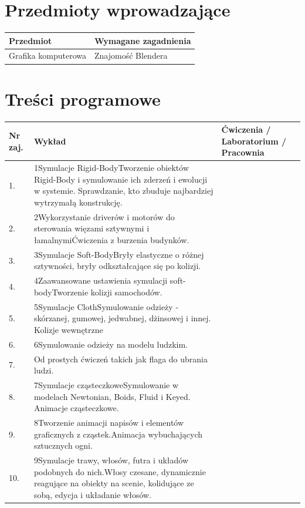 \documentclass[12pt, a4paper]{article}
\begin{document}
\section{Przedmioty wprowadzające}

\begin{tabularx}{\textwidth}{lX}
  \hline
  \textbf{Przedmiot} & \textbf{Wymagane zagadnienia} \\
  \hline
  Grafika komputerowa & Znajomość Blendera \\
  \hline
\end{tabularx}

\section{Treści programowe}

\begin{longtable}{|p{1.5cm}|p{6.5cm}|p{6.5cm}|}
\hline
\textbf{Nr zaj.} & \textbf{Wykład} & \textbf{Ćwiczenia / Laboratorium / Pracownia} \\\hline
\endhead
  \hline
  1. & 1Symulacje Rigid-BodyTworzenie obiektów Rigid-Body i symulowanie ich zderzeń i ewolucji w systemie. Sprawdzanie, kto zbuduje najbardziej wytrzymałą konstrukcję. &  \\
  \hline
  2. & 2Wykorzystanie driverów i motorów do sterowania więzami sztywnymi i łamalnymiĆwiczenia z burzenia budynków. &  \\
  \hline
  3. & 3Symulacje Soft-BodyBryły elastyczne o różnej sztywności, bryły odkształcające się po kolizji. &  \\
  \hline
  4. & 4Zaawansowane ustawienia symulacji soft-bodyTworzenie kolizji samochodów. &  \\
  \hline
  5. & 5Symulacje ClothSymulowanie odzieży - skórzanej, gumowej, jedwabnej, dżinsowej i innej. Kolizje wewnętrzne &  \\
  \hline
  6. & 6Symulowanie odzieży na modelu ludzkim. &  \\
  \hline
  7. & Od prostych ćwiczeń takich jak flaga do ubrania ludzi. &  \\
  \hline
  8. & 7Symulacje cząsteczkoweSymulowanie w modelach Newtonian, Boids, Fluid i Keyed. Animacje cząsteczkowe. &  \\
  \hline
  9. & 8Tworzenie animacji napisów i elementów graficznych z cząstek.Animacja wybuchających sztucznych ogni. &  \\
  \hline
  10. & 9Symulacje trawy, włosów, futra i układów podobnych do nich.Włosy czesane, dynamicznie reagujące na obiekty na scenie, kolidujące ze sobą, edycja i układanie włosów. &  \\

\end{longtable}
\end{document}
